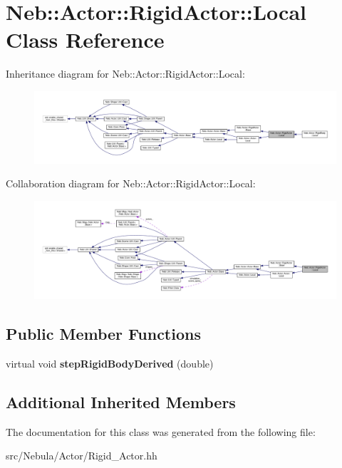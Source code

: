 \hypertarget{classNeb_1_1Actor_1_1RigidActor_1_1Local}{\section{Neb\-:\-:Actor\-:\-:Rigid\-Actor\-:\-:Local Class Reference}
\label{classNeb_1_1Actor_1_1RigidActor_1_1Local}
}


Inheritance diagram for Neb\-:\-:Actor\-:\-:Rigid\-Actor\-:\-:Local\-:
\nopagebreak
\begin{figure}[H]
\begin{center}
\leavevmode
\includegraphics[width=350pt]{classNeb_1_1Actor_1_1RigidActor_1_1Local__inherit__graph}
\end{center}
\end{figure}


Collaboration diagram for Neb\-:\-:Actor\-:\-:Rigid\-Actor\-:\-:Local\-:
\nopagebreak
\begin{figure}[H]
\begin{center}
\leavevmode
\includegraphics[width=350pt]{classNeb_1_1Actor_1_1RigidActor_1_1Local__coll__graph}
\end{center}
\end{figure}
\subsection*{Public Member Functions}
\begin{DoxyCompactItemize}
\item 
\hypertarget{classNeb_1_1Actor_1_1RigidActor_1_1Local_a32abbc25bf737c819daf069ac5f43fb6}{virtual void {\bfseries step\-Rigid\-Body\-Derived} (double)}\label{classNeb_1_1Actor_1_1RigidActor_1_1Local_a32abbc25bf737c819daf069ac5f43fb6}

\end{DoxyCompactItemize}
\subsection*{Additional Inherited Members}


The documentation for this class was generated from the following file\-:\begin{DoxyCompactItemize}
\item 
src/\-Nebula/\-Actor/Rigid\-\_\-\-Actor.\-hh\end{DoxyCompactItemize}
